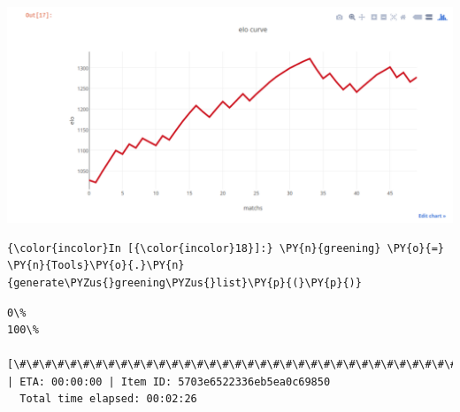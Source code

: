 \includegraphics[width=\textwidth,height=\textheight,keepaspectratio]{p2}\\

\begin{Verbatim}[commandchars=\\\{\}]
  {\color{incolor}In [{\color{incolor}18}]:} \PY{n}{greening} \PY{o}{=} \PY{n}{Tools}\PY{o}{.}\PY{n}{generate\PYZus{}greening\PYZus{}list}\PY{p}{(}\PY{p}{)}
\end{Verbatim}

\begin{Verbatim}[commandchars=\\\{\}]
  0\%                                                                  100\%
  [\#\#\#\#\#\#\#\#\#\#\#\#\#\#\#\#\#\#\#\#\#\#\#\#\#\#\#\#\#\#\#\#\#\#\#\#\#\#\#\#\#\#\#\#\#\#\#\#\#\#\#\#\#\#\#\#\#\#\#\#\#\#\#\#\#\#\#\#\#\#] | ETA: 00:00:00 | Item ID: 5703e6522336eb5ea0c69850
  Total time elapsed: 00:02:26
\end{Verbatim}

